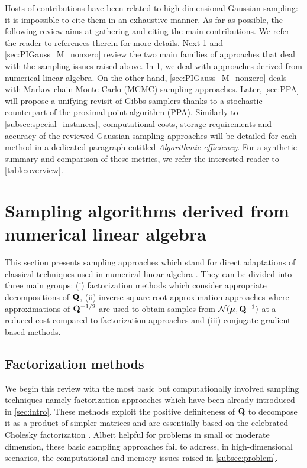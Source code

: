 \documentclass[nohypdvips,onefignum,onetabnum]{siamart171218}
\begin{document}
Hosts of contributions have been related to high-dimensional Gaussian sampling: it is impossible to  cite them in an exhaustive manner.
As far as possible, the following review aims at gathering and citing the main contributions. 
We refer the reader to references therein for more details.
Next \cref{sec:PIGauss_M_zero} and \cref{sec:PIGauss_M_nonzero} review the two main families of approaches that deal with the sampling issues raised above. 
In \cref{sec:PIGauss_M_zero}, we deal with approaches derived from numerical linear algebra. 
On the other hand, \cref{sec:PIGauss_M_nonzero} deals with Markov chain Monte Carlo (MCMC)  sampling  approaches. 
Later, \cref{sec:PPA} will propose a unifying revisit of Gibbs samplers thanks to a stochastic counterpart of the proximal point algorithm (PPA).
Similarly to \cref{subsec:special_instances}, computational costs, storage requirements and accuracy of the reviewed Gaussian sampling approaches will be detailed for each method in a dedicated paragraph entitled \emph{Algorithmic efficiency}.
For a synthetic summary and comparison of these metrics, we refer the interested reader to \cref{table:overview}.

\section{Sampling algorithms derived from numerical linear algebra}
\label{sec:PIGauss_M_zero}

This section presents sampling approaches which stand for direct adaptations of classical techniques used in numerical linear algebra \cite{Golub1989}.
They can be divided into three main groups: (i) factorization methods which consider appropriate decompositions of $\mathbf{Q}$, (ii) inverse square-root approximation approaches where approximations of $\mathbf{Q}^{-1/2}$ are used to obtain samples from $\mathcal{N}(\boldsymbol{\mu},\mathbf{Q}^{-1})$ at a reduced cost compared to factorization approaches and (iii) conjugate gradient-based methods.

\subsection{Factorization methods}
\label{subsec:factorization_methods}
We begin this review with the most basic but computationally involved sampling techniques namely factorization approaches which have been already introduced in \cref{sec:intro}.
These methods exploit the positive definiteness of $\mathbf{Q}$ to decompose it as a product of simpler matrices and are essentially based on the celebrated Cholesky factorization \cite{Cholesky1910}.
Albeit helpful for problems in small or moderate dimension, these basic sampling approaches fail to address, in high-dimensional scenarios, the computational and memory issues raised in \cref{subsec:problem}.
\end{document}
